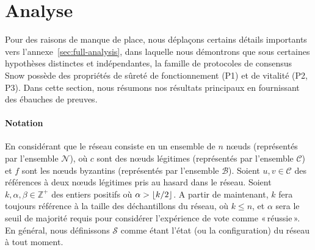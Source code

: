 \documentclass[letterpaper,twocolumn,10pt]{article}
\DeclarePairedDelimiter{\floor}{\lfloor}{\rfloor}
\theoremstyle{definition}
\begin{document}


\section{Analyse}
\label{sec:analysis}
Pour des raisons de manque de place, nous déplaçons certains détails importants vers l'annexe~\ref{sec:full-analysis},
dans laquelle nous démontrons que sous certaines hypothèses distinctes et indépendantes, la famille de protocoles de
consensus Snow possède des propriétés de sûreté de fonctionnement (P1) et de vitalité (P2, P3). Dans cette section,
nous résumons nos résultats principaux en fournissant des ébauches de preuves.


\paragraph{Notation} En considérant que le réseau consiste en un ensemble de $n$ nœuds (représentés par l'ensemble
$\mathcal{N}$), où $c$ sont des nœuds légitimes (représentés par l'ensemble $\mathcal{C}$) et $f$ sont les nœuds
byzantins (représentés par l'ensemble $\mathcal{B}$). Soient $u, v \in \mathcal{C}$ des références à deux nœuds
légitimes pris au hasard dans le réseau. Soient $k, \alpha, \beta \in \mathbb{Z}^+$ des entiers positifs où
$\alpha > \floor{k/2}$. A partir de maintenant, $k$ fera toujours référence à la taille des déchantillons du réseau,
où $k \leq n$, et $\alpha$ sera le seuil de majorité requis pour considérer l'expérience de vote comme «\,réussie\,».
En général, nous définissons $\mathcal{S}$ comme étant l'état (ou la configuration) du réseau à tout moment.
\end{document}
